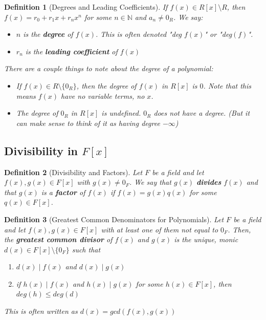 \documentclass{article}
\theoremstyle{break}
\newtheorem{definition}{Definition}[subsection]
\newcommand*{\N}{\mathbb{N}}
\begin{document}
\begin{definition}[Degrees and Leading Coefficients]
  If $f(x) \in R[x] \setminus R$, then $f(x) = r_0 + r_1x + r_n x^n$ for some
  $n \in \N$ and $a_n \neq 0_R$. We say:

  \begin{itemize}
    \item $n$ is the \textbf{degree} of $f(x)$. This is often denoted
    "deg $f(x)$" or "deg$(f)$".
    \item $r_n$ is the \textbf{leading coefficient} of $f(x)$
  \end{itemize}

  There are a couple things to note about the degree of a polynomial:
  \begin{itemize}
    \item If $f(x) \in R \setminus \{ 0_R \}$, then the degree of $f(x)$ in
    $R[x]$ is $0$. Note that this means $f(x)$ have no variable terms, no $x$. 
    \item The degree of $0_R$ in $R[x]$ is undefined. $0_R$ does not have a
    degree. (But it can make sense to think of it as having degree $-\infty$)
  \end{itemize}
\end{definition}

\subsection{Divisibility in $F[x]$}

\begin{definition}[Divisibility and Factors]
  Let $F$ be a field and let $f(x), g(x) \in F[x]$ with $g(x) \neq 0_F$. We say
  that $g(x)$ \textbf{divides} $f(x)$ and that $g(x)$ is a \textbf{factor} of
  $f(x)$ if $f(x) = g(x)q(x)$ for some $q(x) \in F[x]$.
\end{definition}

\begin{definition}[Greatest Common Denominators for Polynomials]
  Let $F$ be a field and let $f(x), g(x) \in F[x]$ with at least one of them
  not equal to $0_F$. Then, the \textbf{greatest common divisor} of $f(x)$ and
  $g(x)$ is the unique, monic $d(x) \in F[x] \setminus \{0_F\}$ such that 
  \begin{enumerate}
    \item $d(x) \mid f(x)$ and $d(x) \mid g(x)$
    \item if $h(x) \mid f(x)$ and $h(x) \mid g(x)$ for some $h(x) \in F[x]$,
    then $deg(h) \leq deg(d)$
  \end{enumerate}
  This is often written as $d(x) = gcd(f(x), g(x))$
\end{definition}
\end{document}
